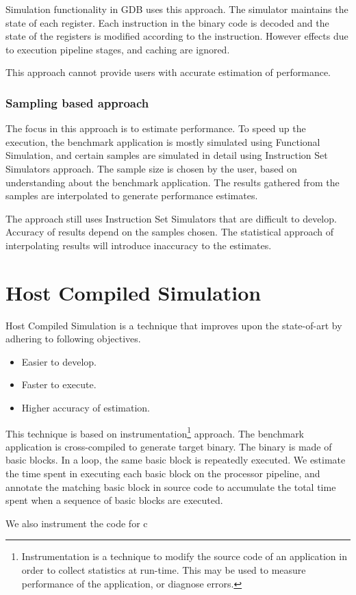 Simulation functionality in GDB uses this approach. The simulator maintains the state of each register. Each instruction in the binary code is decoded and the state of the registers is modified according to the instruction. However effects due to execution pipeline stages, and caching are ignored.

This approach cannot provide users with accurate estimation of performance.

\subsubsection{Sampling based approach} 
The focus in this approach is to estimate performance. To speed up the execution, the benchmark application is mostly simulated using Functional Simulation, and certain samples are simulated in detail using Instruction Set Simulators approach. The sample size is chosen by the user, based on understanding about the benchmark application. The results gathered from the samples are interpolated to generate performance estimates.

The approach still uses Instruction Set Simulators that are difficult to develop. Accuracy of results depend on the samples chosen. The statistical approach of interpolating results will introduce inaccuracy to the estimates.


\section{Host Compiled Simulation}
Host Compiled Simulation is a technique that improves upon the state-of-art by adhering to following objectives.

\begin{itemize} \itemsep -10pt
\item Easier to develop.
\item Faster to execute.
\item Higher accuracy of estimation.
\end{itemize}

This technique is based on instrumentation\footnote{Instrumentation is a technique to modify the source code of an application in order to collect statistics at run-time. This may be used to measure performance of the application, or diagnose errors.} approach. The benchmark application is cross-compiled to generate target binary. The binary is made of basic blocks. In a loop, the same basic block is repeatedly executed. We estimate the time spent in executing each basic block on the processor pipeline, and annotate the matching basic block in source code to accumulate the total time spent when a sequence of basic blocks are executed. 

We also instrument the code for c

